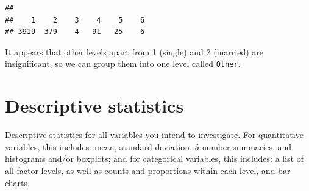 \documentclass[
]{article}
\newenvironment{Shaded}{\begin{snugshade}}{\end{snugshade}}
\newcommand{\AttributeTok}[1]{\textcolor[rgb]{0.13,0.29,0.53}{#1}}
\newcommand{\FunctionTok}[1]{\textcolor[rgb]{0.13,0.29,0.53}{\textbf{#1}}}
\newcommand{\NormalTok}[1]{#1}
\newcommand{\OtherTok}[1]{\textcolor[rgb]{0.56,0.35,0.01}{#1}}
\newcommand{\SpecialCharTok}[1]{\textcolor[rgb]{0.81,0.36,0.00}{\textbf{#1}}}
\newcommand{\StringTok}[1]{\textcolor[rgb]{0.31,0.60,0.02}{#1}}
\begin{document}
\begin{verbatim}
## 
##    1    2    3    4    5    6 
## 3919  379    4   91   25    6
\end{verbatim}

It appears that other levels apart from 1 (single) and 2 (married) are
insignificant, so we can group them into one level called
\texttt{Other}.

\begin{Shaded}
\end{Shaded}

\hypertarget{descriptive-statistics}{%
\section{Descriptive statistics}\label{descriptive-statistics}}

Descriptive statistics for all variables you intend to investigate. For
quantitative variables, this includes: mean, standard deviation,
5-number summaries, and histograms and/or boxplots; and for categorical
variables, this includes: a list of all factor levels, as well as counts
and proportions within each level, and bar charts.
\end{document}
